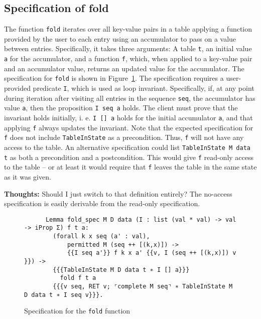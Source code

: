 \documentclass[10pt,a4paper]{article}
\renewcommand{\fcolorbox}[4][]{#4}}
\newcommand{\thoughts}[1]{\noindent\fcolorbox{black}{cyan}{\parbox{\textwidth}{\textbf{Thoughts:} \linebreak #1}}}
\begin{document}
\subsection{Specification of fold}
\label{sec:fold_spec}
The function \texttt{fold} iterates over all key-value pairs in a table applying a function provided by the user to each entry using an accumulator to pass on a value between entries. Specifically, it takes three arguments: A table \texttt{t}, an initial value \texttt{a} for the accumulator, and a function \texttt{f}, which, when applied to a key-value pair and an accumulator value, returns an updated value for the accumulator. The specification for \texttt{fold} is shown in Figure~\ref{fig:fold_spec}. The specification requires a user-provided predicate \texttt{I}, which is used as loop invariant. Specifically, if, at any point during iteration after visiting all entries in the sequence \texttt{seq}, the accumulator has value \texttt{a}, then the proposition \texttt{I seq a} holds. The client must prove that the invariant holds initially, i. e. \texttt{I [] a} holds for the initial accumulator \texttt{a}, and that applying \texttt{f} always updates the invariant. Note that the expected specification for \texttt{f} does not include \texttt{TableInState} as a precondition. Thus, \texttt{f} will not have any access to the table. An alternative specification could list \texttt{TableInState M data t} as both a precondition and a postcondition. This would give \texttt{f} read-only access to the table -- or at least it would require that \texttt{f} leaves the table in the same state as it was given.

\thoughts{Should I just switch to that definition entirely? The no-access specification is easily derivable from the read-only specification.}

\begin{figure}
\begin{verbatim}
      Lemma fold_spec M D data (I : list (val * val) -> val -> iProp Σ) f t a:
        (forall k x seq (a' : val),
            permitted M (seq ++ [(k,x)]) ->
            {{I seq a'}} f k x a' {{v, I (seq ++ [(k,x)]) v }}) ->
        {{{TableInState M D data t ∗ I [] a}}}
          fold f t a
        {{{v seq, RET v; ⌜complete M seq⌝ ∗ TableInState M D data t ∗ I seq v}}}.
\end{verbatim}
\caption{Specification for the \texttt{fold} function}
\label{fig:fold_spec}
\end{figure}
\end{document}
